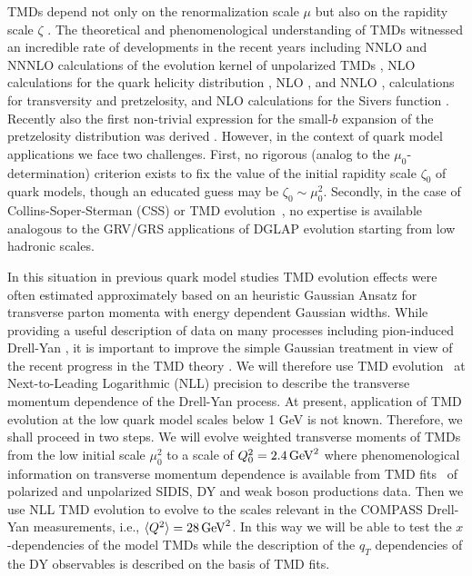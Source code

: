 \documentclass[a4paper]{article}
\newcommand{\la}{\langle}
\newcommand{\ra}{\rangle}
\begin{document}
TMDs depend not only on the renormalization scale $\mu$ but also on 
the rapidity scale $\zeta$ \cite{Collins:2011zzd}. The theoretical and
phenomenological understanding of TMDs witnessed an incredible rate of 
developments in the recent years including NNLO and NNNLO calculations 
of the evolution kernel of unpolarized TMDs
\cite{Gehrmann:2014yya,Echevarria:2015byo,Echevarria:2015usa,Echevarria:2016scs,Li:2016ctv,Vladimirov:2016dll,Luo:2019hmp,Luo:2019szz,Ebert:2020yqt},
NLO calculations for the quark helicity distribution 
\cite{Gutierrez-Reyes:2017glx}, 
NLO \cite{Gutierrez-Reyes:2017glx}, and NNLO \cite{Gutierrez-Reyes:2018iod},
calculations for transversity and pretzelosity, 
and NLO calculations for the Sivers function 
\cite{Ji:2006ub,Koike:2007dg,Sun:2013hua,Dai:2014ala,Scimemi:2019gge}.
Recently also the first non-trivial expression for the small-$b$
expansion of the pretzelosity distribution was derived \cite{Moos:2020wvd}.
However, in the context of quark model applications we face two challenges.
First, no rigorous (analog to the $\mu_0$-determination) criterion exists 
to fix the value of the initial rapidity scale $\zeta_0$ of quark models, 
though an educated guess may be $\zeta_0\sim\mu_0^2$.
Secondly, in the case of Collins-Soper-Sterman (CSS) or TMD evolution~\cite{Collins:1984kg,Collins:2011zzd},
no expertise is available analogous
to the GRV/GRS applications of DGLAP evolution starting from low hadronic scales.

In this situation in previous quark model studies 
TMD evolution effects were often estimated approximately
\cite{Boffi:2009sh,Pasquini:2011tk,Pasquini:2014ppa} based on
an heuristic Gaussian Ansatz for transverse parton momenta with
energy dependent Gaussian widths. While providing a useful 
description of data on many processes including pion-induced Drell-Yan
\cite{Schweitzer:2010tt}, it is important to improve the simple Gaussian treatment in view of the recent progress in the TMD theory  
\cite{Gehrmann:2014yya,Echevarria:2015byo,Echevarria:2015usa,Echevarria:2016scs,Li:2016ctv,Vladimirov:2016dll,Luo:2019hmp,Luo:2019szz,Ebert:2020yqt,Gutierrez-Reyes:2017glx,Gutierrez-Reyes:2018iod,Ji:2006ub,Koike:2007dg,Sun:2013hua,Dai:2014ala,Scimemi:2019gge,Moos:2020wvd}.
We will therefore use TMD evolution~\cite{Collins:2011zzd} 
at  Next-to-Leading Logarithmic (NLL) precision 
to describe the transverse momentum dependence of the Drell-Yan process.
At present, application of TMD evolution at the low quark 
model scales below 1 GeV is not known. Therefore,  we shall proceed in two steps. We will evolve weighted
transverse moments of TMDs from the low initial scale $\mu_{0}^{2}$ to a scale of $Q_0^2=2.4\,{\rm GeV}^2$
where phenomenological information on transverse momentum dependence 
is available from TMD fits~\cite{Su:2014wpa, Kang:2014zza,Kang:2015msa, Bacchetta:2017gcc,Scimemi:2019cmh,Bacchetta:2019sam} of polarized and unpolarized SIDIS, DY and weak boson productions data. Then we use NLL TMD  evolution to evolve to the scales relevant in the 
COMPASS Drell-Yan measurements, i.e., $\la Q^2\ra=28\,{\rm GeV}^2$.
In this way we will be able to test the $x$-dependencies of the model TMDs 
while the description of the $q_T$ dependencies of the DY observables
is described on the basis of TMD fits. 
\end{document}
